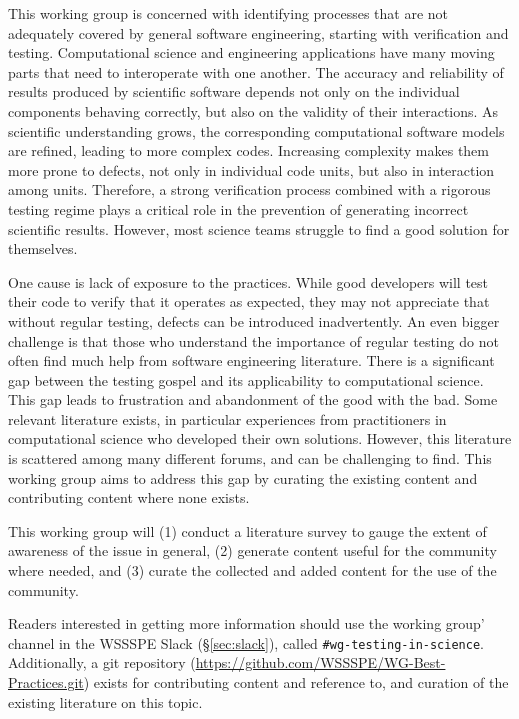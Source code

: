 \documentclass[11pt, oneside]{amsart}
\begin{document}
This working group is concerned with identifying processes that are not adequately
covered by general software engineering, starting with verification and testing.
Computational science and engineering applications have many moving
parts that need to interoperate with one another. The accuracy and
reliability of results produced by scientific software depends not
only on the individual components behaving correctly, but also on the
validity of their interactions.
As scientific understanding grows,
the corresponding computational software models are refined, leading
to more complex codes. Increasing complexity makes them more prone to
defects, not only in individual code units, but also in interaction
among units. Therefore, a strong verification process combined with a
rigorous testing regime plays a critical role in the prevention of
generating incorrect scientific results. However, most science teams
struggle to find a good solution for themselves.

One cause is lack of exposure to the practices. While
good developers will test their code to
verify that it operates as expected, they may not appreciate
that without regular testing, defects can be introduced
inadvertently.
%
An even bigger challenge is that those who understand
the importance of regular testing do not often find much help from
software engineering literature. There is a significant gap between
the testing gospel and its applicability to computational science. This
gap leads to frustration and abandonment of the good with the bad. Some
relevant literature exists, in particular experiences from
practitioners in computational science who developed their own
solutions. However, this literature is scattered among many different
forums, and can be challenging to find. This working group aims to
address this gap by curating the existing content and contributing
content where none exists.

This working group will (1) conduct a literature survey to gauge the extent
of awareness of the issue in general, (2) generate content useful for
the community where needed, and (3) curate the collected and added
content for the use of the community.

Readers interested in getting more information should use the working group'
channel in the WSSSPE Slack (\S\ref{sec:slack}), called
\texttt{\#wg-testing-in-science}.
Additionally, a git
repository (\url{https://github.com/WSSSPE/WG-Best-Practices.git}) exists for contributing content and reference to, and
curation of the existing literature on this topic.
\end{document}
